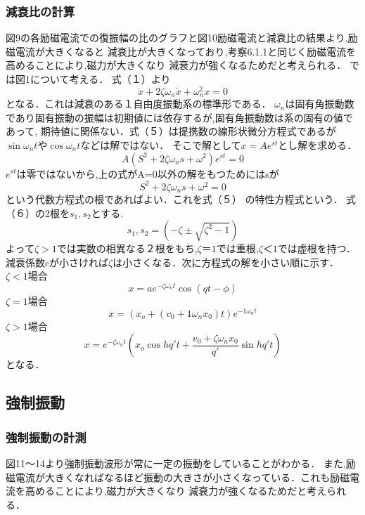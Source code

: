 \documentclass[a4paper,10.5pt]{jsarticle}
\begin{document}
\subsubsection{減衰比の計算}
図9の各励磁電流での復振幅の比のグラフと図10励磁電流と減衰比の結果より,励磁電流が大きくなると
減衰比が大きくなっており,考察6.1.1と同じく励磁電流を高めることにより,磁力が大きくなり
減衰力が強くなるためだと考えられる．
では図1について考える．
式（１）より
\begin{equation}
  \ddot{x}+2\zeta\omega_n\dot{x}+\omega_n^2x = 0
\end{equation}
となる．これは減衰のある１自由度振動系の標準形である．
$\omega_n$は固有角振動数であり固有振動の振幅は初期値には依存するが,固有角振動数は系の固有の値であって,
期待値に関係ない．式（５）は提携数の線形状微分方程式であるが$\sin\omega_{n}t$や$\cos\omega_{n}t$などは解ではない．
そこで解として$x=Ae^{st}$とし解を求める．
\begin{equation}
  A(S^2+2\zeta\omega_{n}s+\omega^2)e^{st} = 0
\end{equation}
$e^{st}$は零ではないから,上の式がA=0以外の解をもつためにはsが
\begin{equation}
  S^2+2\zeta\omega_{n}s+\omega^2= 0
\end{equation}
という代数方程式の根であればよい．これを式（５） の特性方程式という．
式（６）の2根を$s_1,s_2$とする.
\begin{equation}
  s_1,s_2= (-\zeta\pm\sqrt{\zeta^2-1})
\end{equation}
よって$\zeta>1$では実数の相異なる２根をもち,$\zeta＝1$では重根,$\zeta＜1$では虚根を持つ．
減衰係数$c$が小さければ$\zeta$は小さくなる．次に方程式の解を小さい順に示す．\\
$\zeta<1$場合
\begin{equation}
  x=ae^{-\zeta\omega_{n}t}\cos(qt-\phi)
\end{equation}
$\zeta=1$場合
\begin{equation}
  x=(x_o+(v_0+1\omega_nx_0)t)e^{-1\omega_nt}
\end{equation}
$\zeta>1$場合
\begin{equation}
  x=e^{-\zeta\omega_{n}t}(x_o\cos{h}q't+\dfrac{v_0+\zeta\omega_nx_0}{q'}\sin{hq't})
\end{equation}
となる．

\subsection{強制振動}
\subsubsection{強制振動の計測}
図11〜14より強制振動波形が常に一定の振動をしていることがわかる．
また,励磁電流が大きくなればなるほど振動の大きさが小さくなっている．これも励磁電流を高めることにより,磁力が大きくなり
減衰力が強くなるためだと考えられる．
\end{document}
